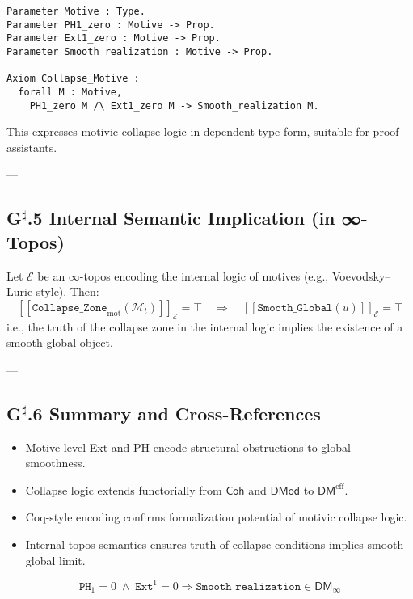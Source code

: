 \documentclass[11pt]{article}
\begin{document}
\begin{lstlisting}[language=Coq]
Parameter Motive : Type.
Parameter PH1_zero : Motive -> Prop.
Parameter Ext1_zero : Motive -> Prop.
Parameter Smooth_realization : Motive -> Prop.

Axiom Collapse_Motive :
  forall M : Motive,
    PH1_zero M /\ Ext1_zero M -> Smooth_realization M.
\end{lstlisting}

This expresses motivic collapse logic in dependent type form, suitable for proof assistants.

---

\subsection*{G$^\sharp$.5 Internal Semantic Implication (in ∞-Topos)}

Let \( \mathcal{E} \) be an $\infty$-topos encoding the internal logic of motives (e.g., Voevodsky–Lurie style).  
Then:
\[
[\![\texttt{Collapse\_Zone}_{\mathrm{mot}}(\mathcal{M}_t)]\!]_{\mathcal{E}} = \top 
\quad \Rightarrow \quad 
[\![\texttt{Smooth\_Global}(u)]\!]_{\mathcal{E}} = \top
\]
i.e., the truth of the collapse zone in the internal logic implies the existence of a smooth global object.

---

\subsection*{G$^\sharp$.6 Summary and Cross-References}

\begin{itemize}
  \item Motive-level Ext and PH encode structural obstructions to global smoothness.
  \item Collapse logic extends functorially from $\mathsf{Coh}$ and $\mathsf{DMod}$ to $\mathsf{DM}^{\mathrm{eff}}$.
  \item Coq-style encoding confirms formalization potential of motivic collapse logic.
  \item Internal topos semantics ensures truth of collapse conditions implies smooth global limit.
\end{itemize}

\[
\boxed{
\texttt{PH}_1 = 0 \;\land\; \texttt{Ext}^1 = 0 \Rightarrow \texttt{Smooth realization} \in \mathsf{DM}_{\infty}
}
\]


\end{document}
